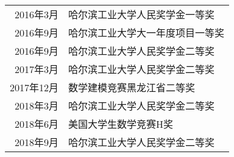 %
%




\begin{tabular}{rl}	
	2016年3月 &哈尔滨工业大学人民奖学金一等奖 \\
	2016年9月 &哈尔滨工业大学大一年度项目一等奖 \\
	2016年9月 &哈尔滨工业大学人民奖学金二等奖 \\
	2017年3月 &哈尔滨工业大学人民奖学金二等奖 \\
	2017年12月 &数学建模竞赛黑龙江省二等奖 \\
	2018年3月 &哈尔滨工业大学人民奖学金二等奖 \\
	2018年6月 &美国大学生数学竞赛H奖 \\
	2018年9月 &哈尔滨工业大学人民奖学金二等奖 \\
\end{tabular}

